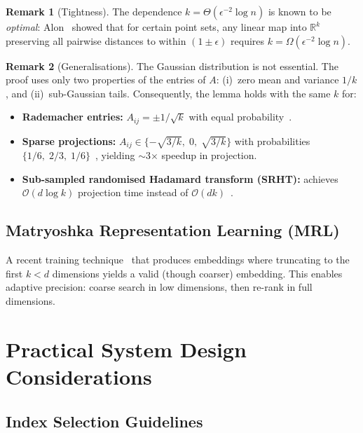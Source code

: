 \documentclass[11pt,a4paper]{article}
\theoremstyle{definition}
\newtheorem{remark}{Remark}[section]
\newcommand{\R}{\mathbb{R}}
\newcommand{\calO}{\mathcal{O}}
\begin{document}
\begin{remark}[Tightness]
The dependence $k = \Theta(\epsilon^{-2}\log n)$ is known to be
\emph{optimal}: Alon~\cite{alon2003jl} showed that for certain point sets, any
linear map into $\R^k$ preserving all pairwise distances to within
$(1 \pm \epsilon)$ requires $k = \Omega(\epsilon^{-2}\log n)$.
\end{remark}

\begin{remark}[Generalisations]
The Gaussian distribution is not essential.  The proof uses only
two properties of the entries of $A$: (i)~zero mean and variance $1/k$,
and (ii)~sub-Gaussian tails.  Consequently, the lemma holds with the
same $k$ for:
\begin{itemize}[nosep]
  \item \textbf{Rademacher entries:} $A_{ij} = \pm 1/\sqrt{k}$ with
    equal probability~\cite{achlioptas2003random}.
  \item \textbf{Sparse projections:} $A_{ij} \in
    \{-\sqrt{3/k},\; 0,\; \sqrt{3/k}\}$ with probabilities
    $\{1/6,\; 2/3,\; 1/6\}$~\cite{achlioptas2003random}, yielding $\sim$3$\times$
    speedup in projection.
  \item \textbf{Sub-sampled randomised Hadamard transform (SRHT):}
    achieves $\calO(d \log k)$ projection time instead of
    $\calO(dk)$~\cite{ailon2009fast}.
\end{itemize}
\end{remark}

\subsection{Matryoshka Representation Learning (MRL)}

A recent training technique~\cite{kusupati2022matryoshka} that produces embeddings where truncating
to the first $k < d$ dimensions yields a valid (though coarser)
embedding.  This enables adaptive precision: coarse search in low
dimensions, then re-rank in full dimensions.


\section{Practical System Design Considerations}\label{sec:practical}

\subsection{Index Selection Guidelines}
\end{document}
